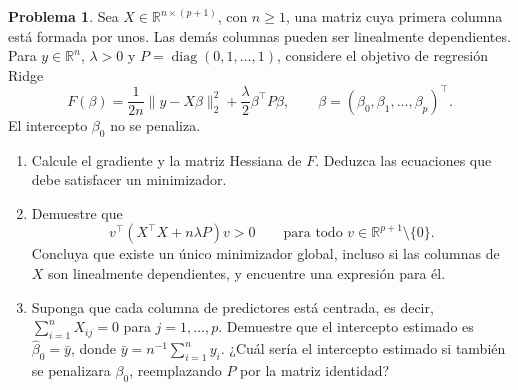 \documentclass[a4paper,12 pt]{article}
\theoremstyle{definition}
\newtheorem{problema}{Problema}
\newcommand{\R}{\mathbb{R}}
\begin{document}
\begin{problema}
Sea $X\in\R^{n\times(p+1)}$, con $n\geq1$, una matriz cuya primera columna está formada por unos. Las demás columnas pueden ser linealmente dependientes. Para $y\in\R^n$, $\lambda>0$ y $P=\operatorname{diag}(0,1,\ldots,1)$, considere el objetivo de regresión Ridge
\[
F(\beta)=\frac{1}{2n}\|y-X\beta\|_2^2+\frac{\lambda}{2}\beta^\top P\beta,
\qquad \beta=(\beta_0,\beta_1,\ldots,\beta_p)^\top.
\]
El intercepto $\beta_0$ no se penaliza.

\begin{enumerate}
	\item Calcule el gradiente y la matriz Hessiana de $F$. Deduzca las ecuaciones que debe satisfacer un minimizador.
	\item Demuestre que
	\[
	v^\top(X^\top X+n\lambda P)v>0\qquad\text{para todo }v\in\R^{p+1}\setminus\{0\}.
	\]
	Concluya que existe un único minimizador global, incluso si las columnas de $X$ son linealmente dependientes, y encuentre una expresión para él.
	\item Suponga que cada columna de predictores está centrada, es decir, $\sum_{i=1}^n X_{ij}=0$ para $j=1,\ldots,p$. Demuestre que el intercepto estimado es $\widehat\beta_0=\bar y$, donde $\bar y=n^{-1}\sum_{i=1}^n y_i$. ¿Cuál sería el intercepto estimado si también se penalizara $\beta_0$, reemplazando $P$ por la matriz identidad?
\end{enumerate}
\end{problema}
\end{document}
